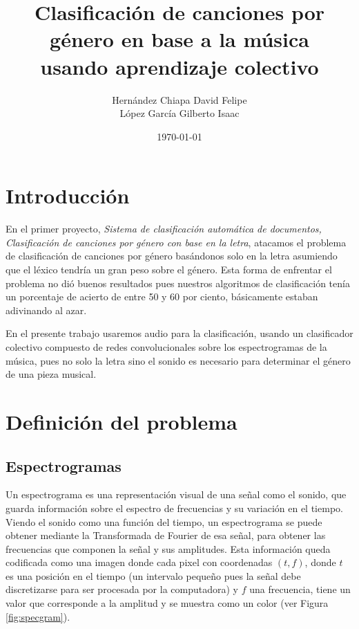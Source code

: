 \documentclass[spanish,11pt,letterpaper]{article}
\title{Clasificación de canciones por género en base a la música\\
usando aprendizaje colectivo}
\author{Hernández Chiapa David Felipe\\
López García Gilberto Isaac}
\affil{Facultad de Ciencias\\{\small Universidad Nacional Autónoma de México}}
\date{\small\today}
\begin{document}
\maketitle

\section{Introducción}

En el primer proyecto, \textit{Sistema de clasificación automática de documentos,
Clasificación de canciones por género con base en la letra}, atacamos el problema
de clasificación de canciones por género basándonos solo en la letra
asumiendo que el léxico tendría un gran peso sobre el género. Esta
forma de enfrentar el problema no dió buenos resultados pues nuestros algoritmos
de clasificación tenía un porcentaje de acierto de entre 50 y 60 por ciento,
básicamente estaban adivinando al azar.

En el presente trabajo usaremos audio para la clasificación, usando un clasificador
colectivo compuesto de redes convolucionales sobre los espectrogramas de la música,
pues no solo la letra sino el sonido es necesario para determinar el género de
una pieza musical.

\section{Definición del problema}

\subsection{Espectrogramas}

Un espectrograma es una representación visual de una señal como el sonido, que
guarda información sobre el espectro de frecuencias y su variación en el tiempo.
Viendo el sonido como una función del tiempo, un espectrograma se puede obtener
mediante la Transformada de Fourier de esa señal, para obtener las frecuencias
que componen la señal y sus amplitudes. Esta información queda codificada como una
imagen donde cada pixel con coordenadas $(t,f)$, donde $t$ es una posición en el
tiempo (un intervalo pequeño pues la señal debe discretizarse para ser procesada
por la computadora) y $f$ una frecuencia, tiene un valor que corresponde a la
amplitud y se muestra como un color (ver Figura \ref{fig:specgram}).
\end{document}
